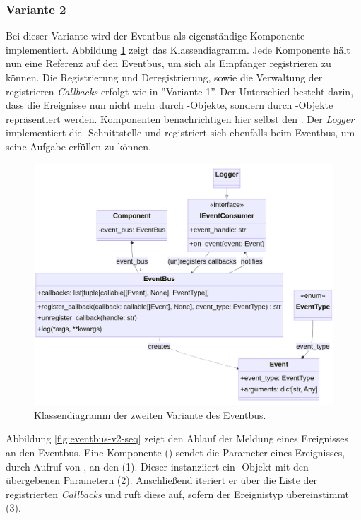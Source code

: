 \subsubsection*{Variante 2}

Bei dieser Variante wird der Eventbus als eigenständige Komponente implementiert. Abbildung \ref{fig:eventbus-v2-class} zeigt das Klassendiagramm. Jede Komponente hält nun eine Referenz auf den Eventbus, um sich als Empfänger registrieren zu können. Die Registrierung und Deregistrierung, sowie die Verwaltung der registrieren \emph{Callbacks} erfolgt wie in ''Variante 1''. Der Unterschied besteht darin, dass die Ereignisse nun nicht mehr durch -Objekte, sondern durch -Objekte repräsentiert werden. Komponenten benachrichtigen hier selbst den . Der \emph{Logger} implementiert die -Schnittstelle und registriert sich ebenfalls beim Eventbus, um seine Aufgabe erfüllen zu können.

\begin{figure}[htb]
	\centering
	\includegraphics[width=1.0\linewidth]{images/diagrams/eventbus-v2-class.png}
	\caption{Klassendiagramm der zweiten Variante des Eventbus.}
	\label{fig:eventbus-v2-class}
\end{figure}

Abbildung \ref{fig:eventbus-v2-seq} zeigt den Ablauf der Meldung eines Ereignisses an den Eventbus. Eine Komponente () sendet die Parameter eines Ereignisses, durch Aufruf von , an den  (1). Dieser instanziiert ein -Objekt mit den übergebenen Parametern (2). Anschließend iteriert er über die Liste der registrierten \emph{Callbacks} und ruft diese auf, sofern der Ereignistyp übereinstimmt (3).

